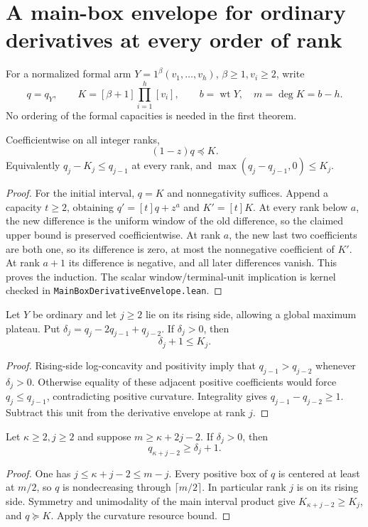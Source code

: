 \section{A main-box envelope for ordinary derivatives at every order of rank}
For a normalized formal arm $Y=1^\beta(v_1,\ldots,v_h)$,
$\beta\ge1,v_i\ge2$, write
\[
 q=q_Y,\qquad K=[\beta+1]\prod_{i=1}^h[v_i],
 \qquad b=\operatorname{wt}Y,\quad m=\deg K=b-h.
\]
No ordering of the formal capacities is needed in the first theorem.

\begin{theorem}
Coefficientwise on all integer ranks,
\[
                  (1-z)q\preceq K.
\]
Equivalently $q_j-K_j\le q_{j-1}$ at every rank, and
$\max(q_j-q_{j-1},0)\le K_j$.
\end{theorem}
\begin{proof}
For the initial interval, $q=K$ and nonnegativity suffices.
Append a capacity $t\ge2$, obtaining
$q'=[t]q+z^a$ and $K'=[t]K$.
At every rank below $a$, the new difference is the uniform
window of the old difference, so the claimed upper bound
is preserved coefficientwise. At rank $a$, the new last
two coefficients are both one, so its difference is zero,
at most the nonnegative coefficient of $K'$.
At rank $a+1$ its difference is negative, and all later
differences vanish. This proves the induction.
The scalar window/terminal-unit implication is kernel checked
in \texttt{MainBoxDerivativeEnvelope.lean}.
\end{proof}

\begin{corollary}
Let $Y$ be ordinary and let $j\ge2$ lie on its rising
side, allowing a global maximum plateau. Put
$\delta_j=q_j-2q_{j-1}+q_{j-2}$.
If $\delta_j>0$, then
\[
                         \delta_j+1\le K_j.
\]
\end{corollary}
\begin{proof}
Rising-side log-concavity and positivity imply that
$q_{j-1}>q_{j-2}$ whenever $\delta_j>0$.
Otherwise equality of these adjacent positive coefficients
would force $q_j\le q_{j-1}$, contradicting positive curvature.
Integrality gives $q_{j-1}-q_{j-2}\ge1$.
Subtract this unit from the derivative envelope at rank $j$.
\end{proof}

\begin{corollary}
Let $\kappa\ge2,j\ge2$ and suppose
$m\ge\kappa+2j-2$. If $\delta_j>0$, then
\[
                       q_{\kappa+j-2}\ge\delta_j+1.
\]
\end{corollary}
\begin{proof}
One has $j\le\kappa+j-2\le m-j$.
Every positive box of $q$ is centered at least at $m/2$,
so $q$ is nondecreasing through $\lceil m/2\rceil$.
In particular rank $j$ is on its rising side.
Symmetry and unimodality of the main interval product give
$K_{\kappa+j-2}\ge K_j$, and $q\succeq K$.
Apply the curvature resource bound.
\end{proof}

